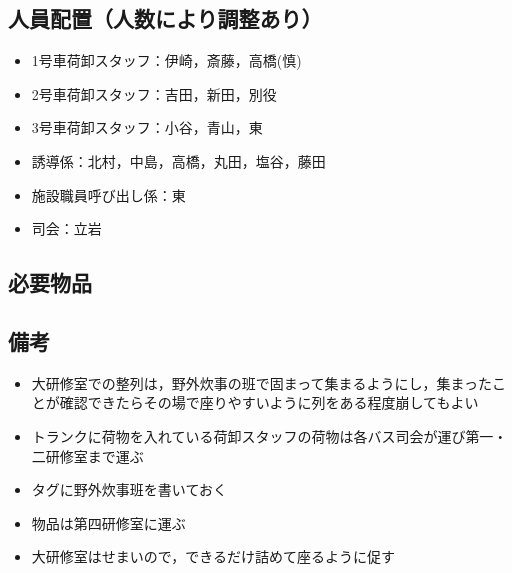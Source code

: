 \subsection{人員配置（人数により調整あり）}
\begin{itemize}

\item 1号車荷卸スタッフ：伊崎，斎藤，高橋(慎)
\item 2号車荷卸スタッフ：吉田，新田，別役

\item 3号車荷卸スタッフ：小谷，青山，東

\item 誘導係：北村，中島，高橋，丸田，塩谷，藤田

\item 施設職員呼び出し係：東
\item 司会：立岩
\end{itemize}


\subsection{必要物品}


\subsection{備考}
\begin{itemize}
\item 大研修室での整列は，野外炊事の班で固まって集まるようにし，集まったことが確認できたらその場で座りやすいように列をある程度崩してもよい
\item トランクに荷物を入れている荷卸スタッフの荷物は各バス司会が運び第一・二研修室まで運ぶ
\item タグに野外炊事班を書いておく
\item 物品は第四研修室に運ぶ
\item 大研修室はせまいので，できるだけ詰めて座るように促す
\end{itemize}


%
